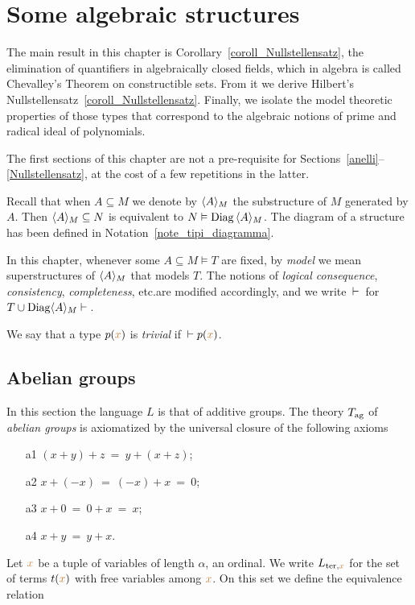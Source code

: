 \documentclass[creche.tex]{subfiles}
\begin{document}
\chapter{Some algebraic structures}
\label{algebraic}

\def\medrel#1{\parbox[b]{6ex}{\hfil$#1$}}
\def\ceq#1#2#3{\parbox[b]{25ex}{$\displaystyle #1$}\medrel{#2}$\displaystyle #3$}

The main result in this chapter is Corollary~\ref{coroll_Nullstellensatz}, the elimination of quantifiers in algebraically closed fields, which in algebra is called Chevalley's Theorem on constructible sets. From it we derive Hilbert's Nullstellensatz~\ref{coroll_Nullstellensatz}. Finally, we isolate the model theoretic properties of those types that correspond to the algebraic notions of prime and radical ideal of polynomials.

The first sections of this chapter are not a pre-requisite for Sections~\ref{anelli}\kern1.5pt--\kern1pt\ref{Nullstellensatz}, at the cost of a few repetitions in the latter.

\begin{notation}\label{notation1}
Recall that when $A\subseteq M$ we denote by \emph{$\langle A\rangle_M$\/} the substructure of $M$ generated by $A$. Then $\langle A\rangle_M\subseteq N$ is equivalent to $N\vDash {\rm Diag}\,\langle A\rangle_M$. The diagram of a structure has been defined in Notation~\ref{note_tipi_diagramma}.

In this chapter, whenever some $A\subseteq M\models T$ are fixed, by \textit{model\/} we mean superstructures of $\langle A\rangle_M$ that models $T$. The notions of \textit{logical consequence}, \textit{consistency}, \textit{completeness}, etc.\@ are modified accordingly, and we write $\,\vdash\,$ for $T\cup{\rm Diag}\langle A\rangle_M\vdash\,$. 

We say that a type $p({\color{brown} x})$ is \emph{trivial\/} if $\,\vdash p({\color{brown} x})$.\QED
\end{notation}

\section{Abelian groups}
\label{gruppi}
In this section the language $L$ is that of additive groups. The theory \emph{$T_{\rm ag}$} of \emph{abelian groups\/} is axiomatized by the universal closure of the following axioms\nobreak
\begin{itemize}
\item[a1] $(x+y) +z\ =\ y+(x+z)$;
\item[a2] $x+(-x)\ =\ (-x)+x\ =\ 0$;
\item[a3] $x+0\ = \ 0+x\ = \ x$;
\item[a4] $x+y\ =\ y+x$.
\end{itemize}
Let ${\color{brown} x}$ be a tuple of variables of length $\alpha$, an ordinal. We write $L_{{\rm ter},{\color{brown} x}}$ for the set of terms $t({\color{brown} x})$ with free variables among ${\color{brown} x}$. On this set we define the equivalence relation
\end{document}
